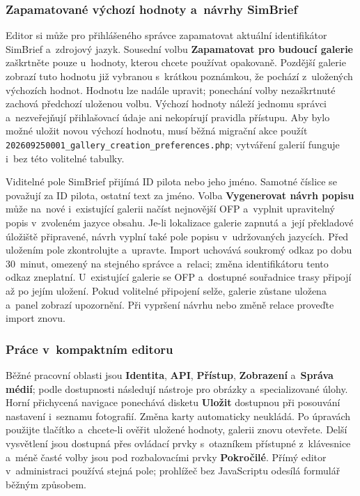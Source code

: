\documentclass[11pt,a4paper]{article}
\newcommand{\ui}[1]{\textbf{#1}}
\newcommand{\codeword}[1]{\nolinkurl{#1}}
\begin{document}
\subsubsection{Zapamatované výchozí hodnoty a~návrhy SimBrief}

Editor si může pro přihlášeného správce zapamatovat aktuální identifikátor
SimBrief a~zdrojový jazyk. Sousední volbu \ui{Zapamatovat pro budoucí galerie}
zaškrtněte pouze u~hodnoty, kterou chcete používat opakovaně. Pozdější galerie
zobrazí tuto hodnotu již vybranou s~krátkou poznámkou, že pochází z~uložených
výchozích hodnot. Hodnotu lze nadále upravit; ponechání volby nezaškrtnuté
zachová předchozí uloženou volbu. Výchozí hodnoty náleží jednomu správci
a~nezveřejňují přihlašovací údaje ani nekopírují pravidla přístupu. Aby bylo
možné uložit novou výchozí hodnotu, musí běžná migrační akce použít
\codeword{202609250001\_gallery\_creation\_preferences.php}; vytváření galerií
funguje i~bez této volitelné tabulky.

Viditelné pole SimBrief přijímá ID pilota nebo jeho jméno. Samotné číslice se
považují za ID pilota, ostatní text za jméno. Volba \ui{Vygenerovat návrh
popisu} může na~nové i~existující galerii načíst nejnovější OFP a~vyplnit
upravitelný popis v~zvoleném jazyce obsahu. Je-li lokalizace galerie zapnutá
a~její překladové úložiště připravené, návrh vyplní také pole popisu
v~udržovaných jazycích. Před uložením pole zkontrolujte a~upravte. Import
uchovává soukromý odkaz po dobu 30~minut, omezený na stejného správce a~relaci;
změna identifikátoru tento odkaz zneplatní. U~existující galerie se OFP
a~dostupné souřadnice trasy připojí až po jejím uložení. Pokud volitelné
připojení selže, galerie zůstane uložena a~panel zobrazí upozornění. Při
vypršení návrhu nebo změně relace proveďte import znovu.

\subsubsection{Práce v~kompaktním editoru}

Běžné pracovní oblasti jsou \ui{Identita}, \ui{API}, \ui{Přístup},
\ui{Zobrazení} a~\ui{Správa médií}; podle dostupnosti následují nástroje pro
obrázky a~specializované úlohy. Horní přichycená navigace ponechává disketu
\ui{Uložit} dostupnou při posouvání nastavení i~seznamu fotografií. Změna karty
automaticky neukládá. Po úpravách použijte tlačítko a~chcete-li ověřit uložené
hodnoty, galerii znovu otevřete. Delší vysvětlení jsou dostupná přes ovládací
prvky s~otazníkem přístupné z~klávesnice a~méně časté volby jsou pod
rozbalovacími prvky \ui{Pokročilé}. Přímý editor v~administraci používá stejná
pole; prohlížeč bez JavaScriptu odesílá formulář běžným způsobem.
\end{document}
